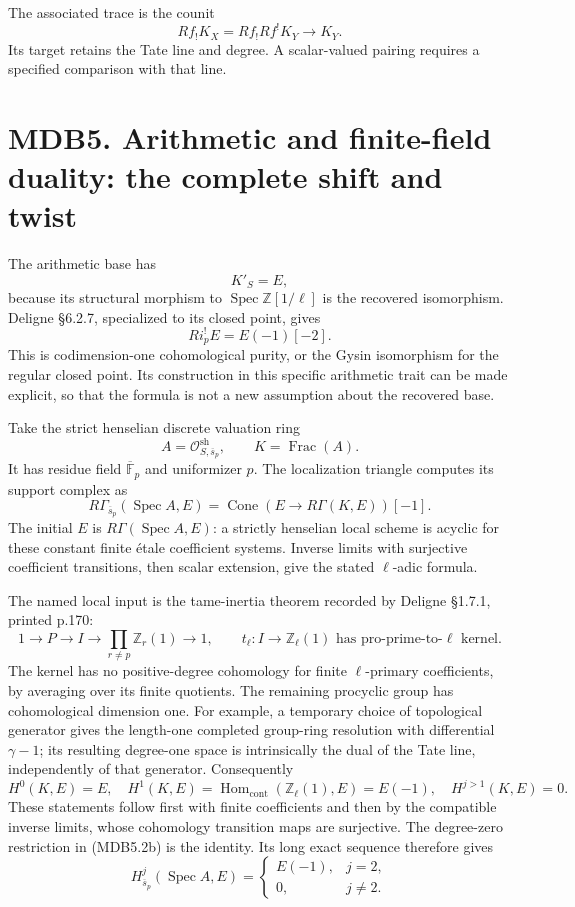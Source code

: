 \documentclass[
]{report}
\begin{document}
The associated trace is the counit \[
Rf_!K_X=Rf_!Rf^!K_Y\longrightarrow K_Y.
\tag{MDB4.7}
\] Its target retains the Tate line and degree. A scalar-valued pairing
requires a specified comparison with that line.

\section{MDB5. Arithmetic and finite-field duality: the complete shift
and
twist}\label{mdb5.-arithmetic-and-finite-field-duality-the-complete-shift-and-twist}

The arithmetic base has \[
K'_S=E,
\tag{MDB5.1}
\] because its structural morphism to
\(\operatorname{Spec}\mathbb Z[1/\ell]\) is the recovered isomorphism.
Deligne §6.2.7, specialized to its closed point, gives \[
Ri_p^!E=E(-1)[-2].
\tag{MDB5.2}
\] This is codimension-one cohomological purity, or the Gysin
isomorphism for the regular closed point. Its construction in this
specific arithmetic trait can be made explicit, so that the formula is
not a new assumption about the recovered base.

Take the strict henselian discrete valuation ring \[
A=\mathcal O^{\mathrm{sh}}_{S,\overline s_p},\qquad K=\operatorname{Frac}(A).
\tag{MDB5.2a}
\] It has residue field \(\overline{\mathbb F}_p\) and uniformizer
\(p\). The localization triangle computes its support complex as \[
R\Gamma_{\overline s_p}(\operatorname{Spec}A,E)
=\operatorname{Cone}\!\left(E\longrightarrow R\Gamma(K,E)\right)[-1].
\tag{MDB5.2b}
\] The initial \(E\) is \(R\Gamma(\operatorname{Spec}A,E)\): a strictly
henselian local scheme is acyclic for these constant finite étale
coefficient systems. Inverse limits with surjective coefficient
transitions, then scalar extension, give the stated \(\ell\)-adic
formula.

The named local input is the tame-inertia theorem recorded by Deligne
§1.7.1, printed p.170: \[
1\longrightarrow P\longrightarrow I
\longrightarrow\prod_{r\neq p}\mathbb Z_r(1)\longrightarrow1,
\qquad
t_\ell:I\longrightarrow\mathbb Z_\ell(1)
\text{ has pro-prime-to-}\ell\text{ kernel}.
\tag{MDB5.2c}
\] The kernel has no positive-degree cohomology for finite
\(\ell\)-primary coefficients, by averaging over its finite quotients.
The remaining procyclic group has cohomological dimension one. For
example, a temporary choice of topological generator gives the
length-one completed group-ring resolution with differential
\(\gamma-1\); its resulting degree-one space is intrinsically the dual
of the Tate line, independently of that generator. Consequently \[
H^0(K,E)=E,\quad
H^1(K,E)=\operatorname{Hom}_{\mathrm{cont}}(\mathbb Z_\ell(1),E)=E(-1),
\quad H^{j>1}(K,E)=0.
\tag{MDB5.2d}
\] These statements follow first with finite coefficients and then by
the compatible inverse limits, whose cohomology transition maps are
surjective. The degree-zero restriction in (MDB5.2b) is the identity.
Its long exact sequence therefore gives \[
H^j_{\overline s_p}(\operatorname{Spec}A,E)=
\begin{cases}E(-1),&j=2,\\0,&j\neq2.\end{cases}
\tag{MDB5.2e}
\]
\end{document}
